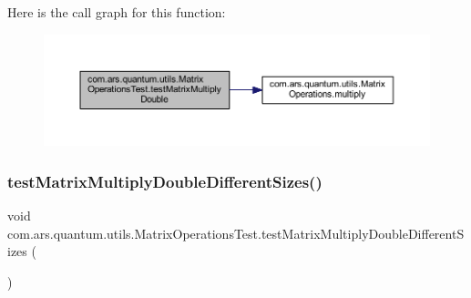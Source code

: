 Here is the call graph for this function\+:\nopagebreak
\begin{figure}[H]
\begin{center}
\leavevmode
\includegraphics[width=350pt]{classcom_1_1ars_1_1quantum_1_1utils_1_1_matrix_operations_test_a32f8097861b74ba4b4ee3d601fcba520_cgraph}
\end{center}
\end{figure}
\hypertarget{classcom_1_1ars_1_1quantum_1_1utils_1_1_matrix_operations_test_aabeb9f046a3146998afea51488839af6}{}\label{classcom_1_1ars_1_1quantum_1_1utils_1_1_matrix_operations_test_aabeb9f046a3146998afea51488839af6} 
\subsubsection{\texorpdfstring{test\+Matrix\+Multiply\+Double\+Different\+Sizes()}{testMatrixMultiplyDoubleDifferentSizes()}}
{\footnotesize\ttfamily void com.\+ars.\+quantum.\+utils.\+Matrix\+Operations\+Test.\+test\+Matrix\+Multiply\+Double\+Different\+Sizes (\begin{DoxyParamCaption}{ }\end{DoxyParamCaption})}

